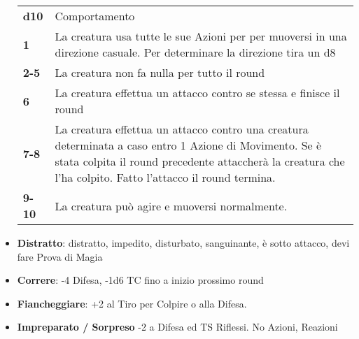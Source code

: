 \documentclass[landscape,10pt,a4paper]{article}
\begin{document}
\begin{multicols}{3}
\begin{dmbox}[title=Condizioni]
\begin{itemize}[leftmargin=0.5cm,itemsep=-1pt,parsep=0pt]
\noindent\begin{tabularx}{0.99\textwidth}{lX}
		\hline
		\textbf{d10} & Comportamento\\
		\textbf{1} & La creatura usa tutte le sue Azioni per per muoversi in una direzione casuale. Per determinare la direzione tira un d8\\
		\textbf{2-5} & La creatura non fa nulla per tutto il round\\
		\textbf{6} & La creatura effettua un attacco contro se stessa e finisce il round\\
		\textbf{7-8} & La creatura effettua un attacco contro una creatura determinata a caso entro 1 Azione di Movimento. Se è stata colpita il round precedente attaccherà la creatura che l'ha colpito. Fatto l'attacco il round termina.\\
		\textbf{9-10} & La creatura può agire e muoversi normalmente.
	\end{tabularx}
		
		\item \textbf{Distratto}: distratto, impedito, disturbato, sanguinante, è sotto attacco, devi fare Prova di Magia
		\item \textbf{Correre}: -4 Difesa, -1d6 TC fino a inizio prossimo round
		\item \textbf{Fiancheggiare}: +2 al Tiro per Colpire o alla Difesa.
		\item \textbf{Impreparato / Sorpreso} -2 a Difesa ed TS Riflessi. No Azioni, Reazioni
	\end{itemize}

\end{dmbox}



\begin{dmbox}[title=Condizioni]
	\begin{itemize}[leftmargin=0.5cm,itemsep=-1pt,parsep=0pt]
	

\end{itemize}
\end{dmbox}
\end{multicols}
\end{document}
